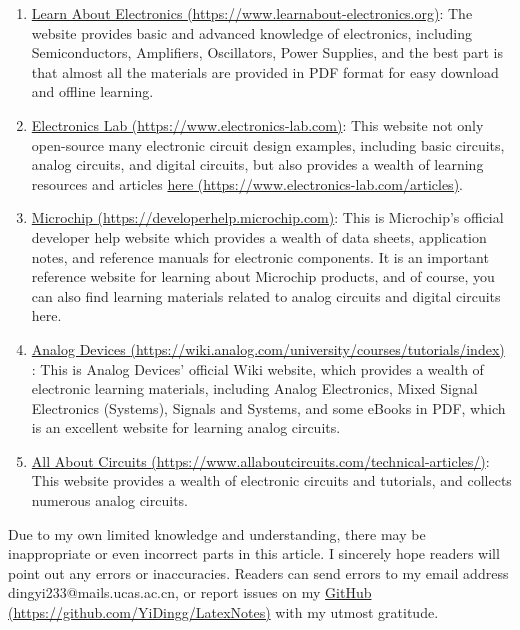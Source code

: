\documentclass[UTF8]{report}
\begin{document}
\begin{enabstract}
\begin{enumerate}
    \item \href{https://www.learnabout-electronics.org}{  Learn About Electronics  {\color{black} (https://www.learnabout-electronics.org)}}: The website provides basic and advanced knowledge of electronics, including Semiconductors, Amplifiers, Oscillators, Power Supplies, and the best part is that almost all the materials are provided in PDF format for easy download and offline learning.
    
    \item \href{https://www.electronics-lab.com}{  Electronics Lab  {\color{black} (https://www.electronics-lab.com)}}: This website not only open-source many electronic circuit design examples, including basic circuits, analog circuits, and digital circuits, but also provides a wealth of learning resources and articles \href{https://www.electronics-lab.com/articles/}{here {\color{black} (https://www.electronics-lab.com/articles)}}.

    \item \href{https://developerhelp.microchip.com}{  Microchip  {\color{black} (https://developerhelp.microchip.com)}}: This is Microchip's official developer help website which provides a wealth of data sheets, application notes, and reference manuals for electronic components. It is an important reference website for learning about Microchip products, and of course, you can also find learning materials related to analog circuits and digital circuits here. 
    
    \item \href{https://wiki.analog.com/university/courses/tutorials/index}{Analog Devices {\color{black}(https://wiki.analog.com/university/courses/tutorials/index)}} : This is Analog Devices' official Wiki website, which provides a wealth of electronic learning materials, including Analog Electronics, Mixed Signal Electronics (Systems), Signals and Systems, and some eBooks in PDF, which is an excellent website for learning analog circuits.

    \item \href{https://www.allaboutcircuits.com/technical-articles/}{  All About Circuits  {\color{black} (https://www.allaboutcircuits.com/technical-articles/)}}: This website provides a wealth of electronic circuits and tutorials, and collects numerous analog circuits.
\end{enumerate}
    
    Due to my own limited knowledge and understanding, there may be inappropriate or even incorrect parts in this article. I sincerely hope readers will point out any errors or inaccuracies. Readers can send errors to my email address {\color{blue} dingyi233@mails.ucas.ac.cn}, or report issues on my \href{https://github.com/YiDingg/LatexNotes}{GitHub {\color{black} (https://github.com/YiDingg/LatexNotes)}} with my utmost gratitude.
\end{enabstract}
\end{document}
